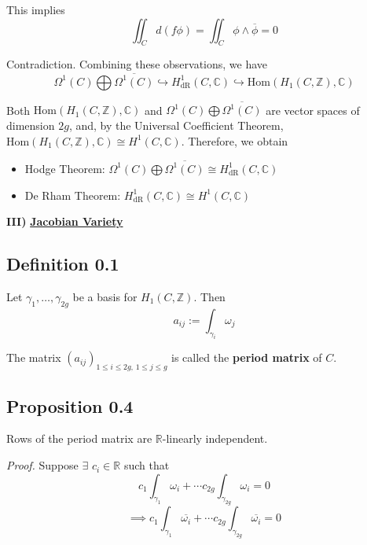 \documentclass[11pt,a4paper]{article}
\begin{document}
This implies
$$\iint_Cd(f\phi) = \iint_C\phi\wedge \overline{\phi} = 0$$

Contradiction. Combining these observations, we have
$$\Omega^1(C)\bigoplus \overline{\Omega^1(C)} \hookrightarrow H^1_{\text{dR}}(C, \mathbb{C}) \hookrightarrow \text{Hom}(H_1(C, \mathbb{Z}), \mathbb{C})$$

Both $\text{Hom}(H_1(C, \mathbb{Z}), \mathbb{C})$ and $\Omega^1(C)\bigoplus \overline{\Omega^1(C)}$ are vector spaces of dimension $2g$, and, by the Universal Coefficient Theorem, $\text{Hom}(H_1(C, \mathbb{Z}), \mathbb{C})\cong H^1(C, \mathbb{C})$. Therefore, we obtain

\begin{itemize}
    \item Hodge Theorem: $\Omega^1(C)\bigoplus \overline{\Omega^1(C)} \cong H^1_{\text{dR}}(C, \mathbb{C})$
    \item De Rham Theorem: $H^1_{\text{dR}}(C, \mathbb{C}) \cong H^1(C, \mathbb{C})$
\end{itemize}


\textbf{III)} \underline{\textbf{Jacobian Variety}}

\subsection*{Definition 0.1} Let $\gamma_1, \ldots, \gamma_{2g}$ be a basis for $H_1(C, \mathbb{Z})$. Then
$$a_{ij}:= \int_{\gamma_i}\omega_j$$

The matrix $(a_{ij})_{1\leq i\leq2g,\,1\leq j\leq g}$ is called the \textbf{period matrix} of $C$.

\subsection*{Proposition 0.4}
    Rows of the period matrix are $\mathbb{R}$-linearly independent.

\textit{Proof.} Suppose $\exists$ $c_i \in \mathbb{R}$ such that
$$c_1\int_{\gamma_1}\omega_i + \cdots c_{2g}\int_{\gamma_{2g}}\omega_i = 0$$
$$\implies c_1\int_{\gamma_1}\overline{\omega_i} + \cdots c_{2g}\int_{\gamma_{2g}}\overline{\omega_i} = 0$$
\end{document}

